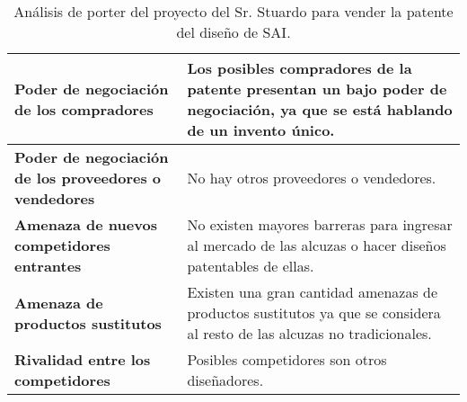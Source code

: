 \begin{table}[]
\centering
\begin{tabular}{|l|l|}
\hline
\textbf{Poder de negociación de los compradores}              & Los posibles compradores de la patente presentan un bajo poder de negociación, ya que se está hablando de un invento único. \\ \hline
\textbf{Poder de negociación de los proveedores o vendedores} & No hay otros proveedores o vendedores.                                                                                      \\ \hline
\textbf{Amenaza de nuevos competidores entrantes}             & No existen mayores barreras para ingresar al mercado de las alcuzas o hacer diseños patentables de ellas.                   \\ \hline
\textbf{Amenaza de productos sustitutos}                      & Existen una gran cantidad amenazas de productos sustitutos ya que se considera al resto de las alcuzas no tradicionales.    \\ \hline
\textbf{Rivalidad entre los competidores}                     & Posibles competidores son otros diseñadores.                                                                                \\ \hline
\end{tabular}
\caption{Análisis de porter del proyecto del Sr. Stuardo para vender la patente del diseño de SAI.}
\label{porter1}
\end{table}
